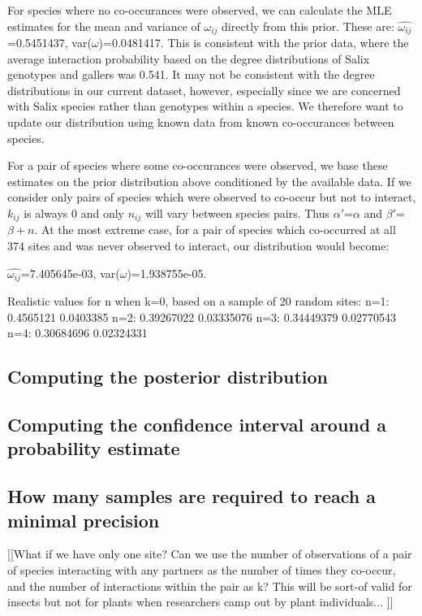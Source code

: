 \documentclass[12pt]{article}
\begin{document}
      For species where no co-occurances were observed, we can calculate the MLE estimates for the mean and variance of $\omega_{ij}$ directly from this prior. These are:
      $\hat{\omega_{ij}}$=0.5451437, var($\omega$)=0.0481417.
      This is consistent with the prior data, where the average interaction probability based on the degree distributions of Salix genotypes and gallers was 0.541. It may not be consistent with the degree distributions in our current dataset, however, especially since we are concerned with Salix species rather than genotypes within a species. We therefore want to update our distribution using known data from known co-occurances between species.


      For a pair of species where some co-occurances were observed, we base these estimates on the prior distribution above conditioned by the available data. If we consider only pairs of species which were observed to co-occur but not to interact, $k_{ij}$ is always 0 and only $n_{ij}$ will vary between species pairs. Thus $\alpha'$=$\alpha$ and $\beta'$=$\beta + n$. At the most extreme case, for a pair of species which co-occurred at all 374 sites and was never observed to interact, our distribution would become:

      $\hat{\omega_{ij}}$=7.405645e-03, var($\omega$)=1.938755e-05.
      

      Realistic values for n when k=0, based on a sample of 20 random sites:
      n=1: 0.4565121 0.0403385
      n=2: 0.39267022 0.03335076
      n=3: 0.34449379 0.02770543
      n=4: 0.30684696 0.02324331






    \subsection*{Computing the posterior distribution}

  \subsection*{Computing the confidence interval around a probability estimate}

    \subsection*{How many samples are required to reach a minimal precision}


  [[What if we have only one site? Can we use the number of observations of a pair of species interacting with any partners as the number of times they co-occur, and the number of interactions within the pair as k? This will be sort-of valid for insects but not for plants when researchers camp out by plant individuals... ]]


\clearpage

     
\end{document}
